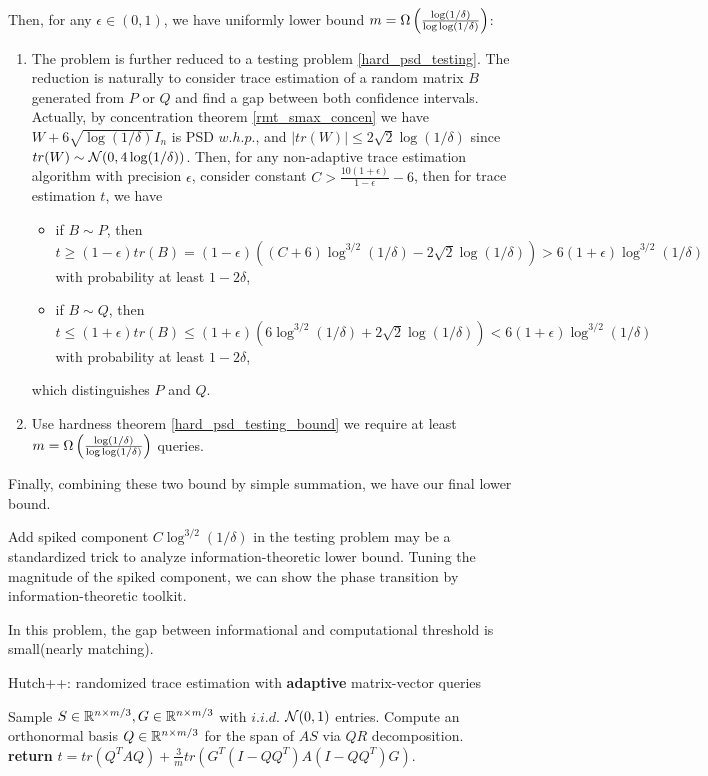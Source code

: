 \documentclass[10pt]{book}
\begin{document}
{\noindent Then, for any $\epsilon\in(0,1)$, we have uniformly lower bound $m=\Omega\left(\frac{\log(1/\delta)}{\log\log(1/\delta)}\right)$:
\begin{enumerate}
    \item The problem is further reduced to a testing problem \ref{hard_psd_testing}.
    The reduction is naturally to consider trace estimation of a random matrix $B$ generated from $P$ or $Q$ and find a gap between both confidence intervals. Actually, by concentration theorem \ref{rmt_smax_concen} we have $W + 6\sqrt{\log(1/\delta)}I_n$ is PSD $w.h.p.$, and $|tr(W)|\le 2\sqrt{2}\log(1/\delta)$ since $tr(W)\sim\mathcal{N}(0,4\log(1/\delta))$. Then, for any non-adaptive trace estimation algorithm with precision $\epsilon$, consider constant $C>\frac{10(1+\epsilon)}{1-\epsilon}-6$, then for trace estimation $t$, we have
    \begin{itemize}
        \item if $B\sim P$, then $t\ge(1-\epsilon)tr(B)=(1-\epsilon)((C+6)\log^{3/2}(1/\delta)-2\sqrt{2}\log(1/\delta))>6(1+\epsilon)\log^{3/2}(1/\delta)$ with probability at least $1-2\delta$,
        \item if $B\sim Q$, then $t\le(1+\epsilon)tr(B)\le(1+\epsilon)(6\log^{3/2}(1/\delta)+2\sqrt{2}\log(1/\delta))<6(1+\epsilon)\log^{3/2}(1/\delta)$ with probability at least $1-2\delta$,
    \end{itemize}
    which distinguishes $P$ and $Q$.
    
    \item Use hardness theorem \ref{hard_psd_testing_bound} we require at least $m=\Omega\left(\frac{\log(1/\delta)}{\log\log(1/\delta)}\right)$ queries. 
\end{enumerate}

\noindent Finally, combining these two bound by simple summation, we have our final lower bound.
}

\begin{rmk}
    Add spiked component $C\log^{3/2}(1/\delta)$ in the testing problem may be a standardized trick to analyze information-theoretic lower bound. Tuning the magnitude of the spiked component, we can show the phase transition by information-theoretic toolkit.
\end{rmk}

In this problem, the gap between informational and computational threshold is small(nearly matching).

\bigskip
\begin{breakablealgorithm}
\caption{Hutch++: randomized trace estimation with \textbf{adaptive} matrix-vector queries}
\label{hutch}
\begin{algorithmic}[1]
\State Sample $S\in\mathbb{R}^{n\times m/3},G\in\mathbb{R}^{n\times m/3}$ with $i.i.d.$ $\mathcal{N}(0,1)$ entries.
\State Compute an orthonormal basis $Q\in\mathbb{R}^{n\times m/3}$ for the span of $AS$ via $QR$ decomposition.
\State \textbf{return} $t=tr(Q^TAQ)+\frac{3}{m}tr(G^T(I-QQ^T)A(I-QQ^T)G)$.
\end{algorithmic}
\end{breakablealgorithm}
\bigskip
\end{document}
